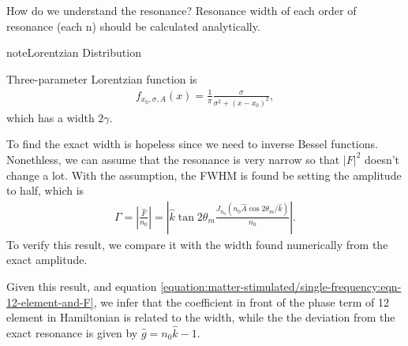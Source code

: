 \documentclass[letterpaper,12pt,english]{sphinxmanual}
\begin{document}
How do we understand the resonance? Resonance width of each order of resonance (each n) should be calculated analytically.

\begin{sphinxadmonition}{note}{Lorentzian Distribution}

Three-parameter Lorentzian function is
\begin{equation*}
\begin{split}f_{x_0,\sigma,A}(x)= \frac{1}{\pi} \frac{\sigma}{\sigma^2 + (x-x_0)^2},\end{split}
\end{equation*}
which has a width \(2\gamma\).
\end{sphinxadmonition}

To find the exact width is hopeless since we need to inverse Bessel functions. Nonethless, we can assume that the resonance is very narrow so that \(\left\lvert F \right\rvert^2\) doesn't change a lot. With the assumption, the FWHM is found be setting the amplitude to half, which is
\begin{equation*}
\begin{split}\Gamma = \left\lvert \frac{\hat F}{n_0} \right\rvert = \left\lvert \hat k \tan 2\theta_m \frac{ J_{n_0}( n_0 \hat A \cos 2\theta_m/\hat k )}{n_0} \right\rvert .\end{split}
\end{equation*}
To verify this result, we compare it with the width found numerically from the exact amplitude.

Given this result, and equation \eqref{equation:matter-stimulated/single-frequency:eqn-12-element-and-F}, we infer that the coefficient in front of the phase term of 12 element in Hamiltonian is related to the width, while the the deviation from the exact resonance is given by \(\hat g=n_0 \hat k - 1\).
\end{document}
